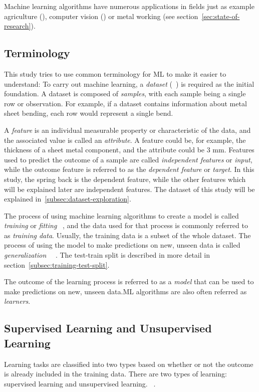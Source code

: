 Machine learning algorithms have numerous applications in fields just as example
agriculture (\cite{yoosefzadeh2021application}), computer vision (\cite{hu2020voronoi}) or metal working
(see section~\ref{sec:state-of-research}).

\subsection{Terminology}\label{subsec:terminology}
This study tries to use common terminology for \ac{ML} to make it easier to understand:
To carry out machine learning, a \textit{dataset} (~\cite[p. 3]{zhou2021machine}) is required as the
initial foundation.
A dataset is composed of \textit{samples}, with each sample being a single row or observation.
For example, if a dataset contains information about metal sheet bending, each row would represent a single bend.

A \textit{feature} is an individual measurable property or characteristic of the data, and the associated value is
called an \textit{attribute}.
A feature could be, for example, the thickness of a sheet metal component, and the attribute could be 3 mm.
Features used to predict the outcome of a sample are called \textit{independent features} or \textit{input}, while the
outcome feature is referred to as the \textit{dependent feature} or \textit{target}.
In this study, the spring back is the dependent feature, while the other features which will be explained later are
independent features.
The dataset of this study will be explained in~\cref{subsec:dataset-exploration}.

The process of using machine learning algorithms to create a model is called \textit{training} or \textit{fitting}
~\cite[p. 4]{el2015machine}, and the data used for that process is commonly referred to as \textit{training data}.
Usually, the training data is a subset of the whole dataset.
The process of using the model to make predictions on new, unseen data is called
\textit{generalization}
~\cite[pp. 26--27]{muller2016introduction}~\cite[p. 4]{zhou2021machine}.
The test-train split is described in more detail in section~\ref{subsec:training-test-split}.

The outcome of the learning process is referred to as a \textit{model} that can be used to make predictions on new,
unseen data.\ac{ML} algorithms are also often referred as \textit{learners}.

\subsection{Supervised Learning and Unsupervised Learning}\label{subsec:supervised-learning}
Learning tasks are classified into two types based on whether or not the outcome is already included in the training
data.
There are two types of learning: supervised learning and unsupervised learning.
~\cite[p. 4]{zhou2021machine}.

